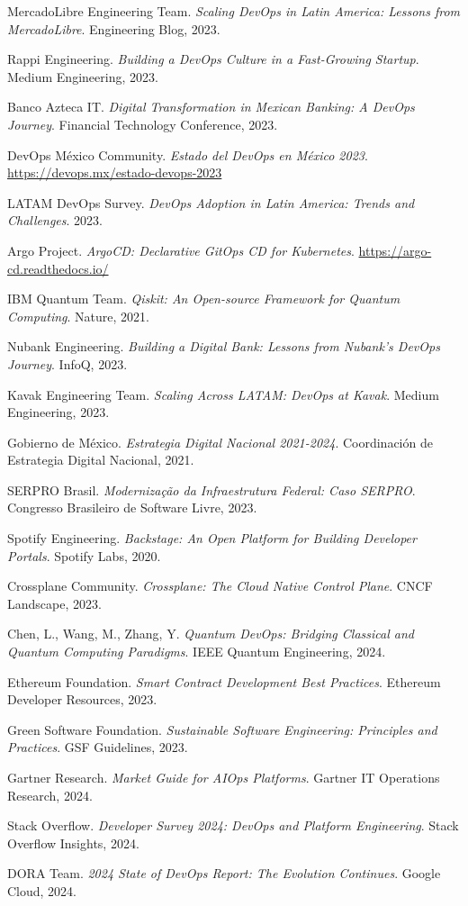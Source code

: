 \documentclass[12pt,a4paper]{article}
\begin{document}
\begin{thebibliography}{15}
MercadoLibre Engineering Team. 
\textit{Scaling DevOps in Latin America: Lessons from MercadoLibre}. Engineering Blog, 2023.

Rappi Engineering. 
\textit{Building a DevOps Culture in a Fast-Growing Startup}. Medium Engineering, 2023.

Banco Azteca IT. 
\textit{Digital Transformation in Mexican Banking: A DevOps Journey}. Financial Technology Conference, 2023.

DevOps México Community. 
\textit{Estado del DevOps en México 2023}. \url{https://devops.mx/estado-devops-2023}

LATAM DevOps Survey. 
\textit{DevOps Adoption in Latin America: Trends and Challenges}. 2023.

Argo Project. 
\textit{ArgoCD: Declarative GitOps CD for Kubernetes}. \url{https://argo-cd.readthedocs.io/}

IBM Quantum Team. 
\textit{Qiskit: An Open-source Framework for Quantum Computing}. Nature, 2021.

Nubank Engineering. 
\textit{Building a Digital Bank: Lessons from Nubank's DevOps Journey}. InfoQ, 2023.

Kavak Engineering Team. 
\textit{Scaling Across LATAM: DevOps at Kavak}. Medium Engineering, 2023.

Gobierno de México. 
\textit{Estrategia Digital Nacional 2021-2024}. Coordinación de Estrategia Digital Nacional, 2021.

SERPRO Brasil. 
\textit{Modernização da Infraestrutura Federal: Caso SERPRO}. Congresso Brasileiro de Software Livre, 2023.

Spotify Engineering. 
\textit{Backstage: An Open Platform for Building Developer Portals}. Spotify Labs, 2020.

Crossplane Community. 
\textit{Crossplane: The Cloud Native Control Plane}. CNCF Landscape, 2023.

Chen, L., Wang, M., Zhang, Y. 
\textit{Quantum DevOps: Bridging Classical and Quantum Computing Paradigms}. IEEE Quantum Engineering, 2024.

Ethereum Foundation. 
\textit{Smart Contract Development Best Practices}. Ethereum Developer Resources, 2023.

Green Software Foundation. 
\textit{Sustainable Software Engineering: Principles and Practices}. GSF Guidelines, 2023.

Gartner Research. 
\textit{Market Guide for AIOps Platforms}. Gartner IT Operations Research, 2024.

Stack Overflow. 
\textit{Developer Survey 2024: DevOps and Platform Engineering}. Stack Overflow Insights, 2024.

DORA Team. 
\textit{2024 State of DevOps Report: The Evolution Continues}. Google Cloud, 2024.
\end{thebibliography}
\end{document}
